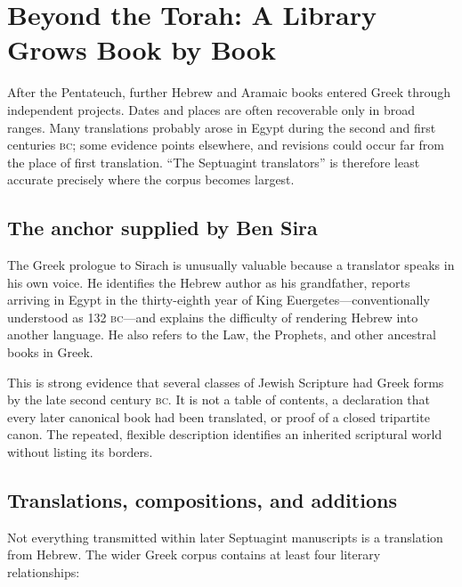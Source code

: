 \section{Beyond the Torah: A Library Grows Book by Book}

After the Pentateuch, further Hebrew and Aramaic books entered Greek through independent projects. Dates and places are often recoverable only in broad ranges. Many translations probably arose in Egypt during the second and first centuries \textsc{bc}; some evidence points elsewhere, and revisions could occur far from the place of first translation. “The Septuagint translators” is therefore least accurate precisely where the corpus becomes largest.

\subsection{The anchor supplied by Ben Sira}

The Greek prologue to Sirach is unusually valuable because a translator speaks in his own voice. He identifies the Hebrew author as his grandfather, reports arriving in Egypt in the thirty-eighth year of King Euergetes---conventionally understood as 132 \textsc{bc}---and explains the difficulty of rendering Hebrew into another language. He also refers to the Law, the Prophets, and other ancestral books in Greek.

This is strong evidence that several classes of Jewish Scripture had Greek forms by the late second century \textsc{bc}. It is not a table of contents, a declaration that every later canonical book had been translated, or proof of a closed tripartite canon. The repeated, flexible description identifies an inherited scriptural world without listing its borders.

\subsection{Translations, compositions, and additions}

Not everything transmitted within later Septuagint manuscripts is a translation from Hebrew. The wider Greek corpus contains at least four literary relationships:

